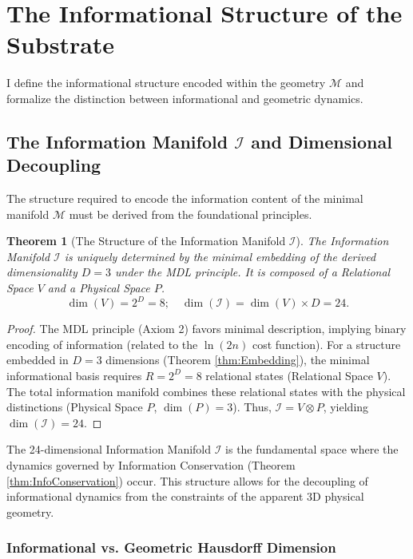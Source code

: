 \documentclass[11pt, a4paper]{article}
\newtheorem{theorem}{Theorem}[section]
\theoremstyle{definition}
\theoremstyle{definition}
\newcommand{\M}{\mathcal{M}}
\newcommand{\Ical}{\mathcal{I}}
\begin{document}
\section{The Informational Structure of the Substrate}

I define the informational structure encoded within the geometry $\M$ and formalize the distinction between informational and geometric dynamics.

\subsection{The Information Manifold \texorpdfstring{$\Ical$}{Ical} and Dimensional Decoupling}

The structure required to encode the information content of the minimal manifold $\M$ must be derived from the foundational principles.

\begin{theorem}[The Structure of the Information Manifold $\Ical$]\label{thm:InfoManifold}
The Information Manifold $\Ical$ is uniquely determined by the minimal embedding of the derived dimensionality $D=3$ under the MDL principle. It is composed of a Relational Space $V$ and a Physical Space $P$.
\begin{equation}
    \dim(V) = 2^D = 8; \quad \dim(\Ical) = \dim(V) \times D = 24.
\end{equation}
\end{theorem}
\begin{proof}
The MDL principle (Axiom 2) favors minimal description, implying binary encoding of information (related to the $\ln(2n)$ cost function). For a structure embedded in $D=3$ dimensions (Theorem \ref{thm:Embedding}), the minimal informational basis requires $R=2^D = 8$ relational states (Relational Space $V$). The total information manifold combines these relational states with the physical distinctions (Physical Space $P$, $\dim(P)=3$). Thus, $\Ical = V \otimes P$, yielding $\dim(\Ical) = 24$.
\end{proof}


The 24-dimensional Information Manifold $\Ical$ is the fundamental space where the dynamics governed by Information Conservation (Theorem \ref{thm:InfoConservation}) occur. This structure allows for the decoupling of informational dynamics from the constraints of the apparent 3D physical geometry.

\subsubsection{Informational vs. Geometric Hausdorff Dimension}
\end{document}
